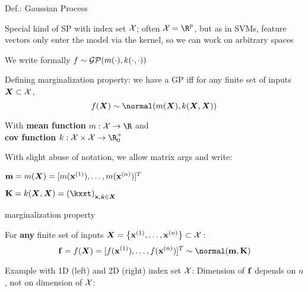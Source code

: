 \documentclass[11pt,compress,t,notes=noshow, xcolor=table]{beamer}
\begin{document}

\begin{framei}[sep=M]{Def.: Gaussian Process ~~ 
}
\item Special kind of SP with index set $\Xspace$; often $\Xspace = \R^p$, but as in SVMs, feature vectors only enter the model via the kernel, so we can work on arbitrary spaces
\item We write formally $f \sim \GPmk$ %

\item Defining marginalization property: we have a GP 
iff for any finite set of inputs $\bm{X} \subset \Xspace$, 
$$
f(\bm{X}) \sim \normal(\mX, \kXX)
$$
\item With \textbf{mean function} $m: \Xspace \rightarrow \R$ and \\
\textbf{cov function} $k: \Xspace \times \Xspace \rightarrow \R^+_0$
\item With slight abuse of notation, we allow matrix args and write:
\vfill
\begin{itemizeM}
\item $\mv = m(\bm{X}) = [m(\xi[1]), \dots, m(\xi[n])]^T$
\item $\Kmat = k(\bm{X}, \bm{X}) = \left(\kxxt \right)_{\xv, \xtil \in \bm{X}}$
\end{itemizeM}

\end{framei}

\begin{framei}[sep=M]{marginalization property}
\item For \textbf{any} finite set of inputs $\bm{X} = \xdat \subset \Xspace:$
    $$
      \fv = f(\bm{X}) = \fvec^T \sim \Nmk
    $$ 


\item Example with 1D (left) and 2D (right) index set $\Xspace$: Dimension of $\fv$ depends on $n$, not on dimension of $\Xspace$:
\vfill

\end{framei}
\end{document}

